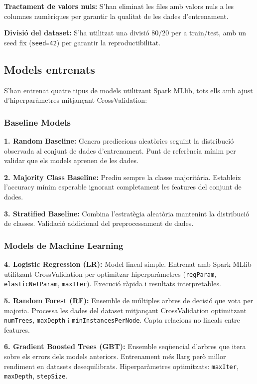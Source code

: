 \documentclass[12pt, a4paper]{article}
\begin{document}
\textbf{Tractament de valors nuls:} S'han eliminat les files amb valors nuls a les columnes numèriques per garantir la qualitat de les dades d'entrenament.

\textbf{Divisió del dataset:} S'ha utilitzat una divisió 80/20 per a train/test, amb un seed fix (\texttt{seed=42}) per garantir la reproductibilitat.

\subsection{Models entrenats}

S'han entrenat quatre tipus de models utilitzant Spark MLlib, tots ells amb ajust d'hiperparàmetres mitjançant CrossValidation:

\subsubsection{Baseline Models}

\textbf{1. Random Baseline:}
Genera prediccions aleatòries seguint la distribució observada al conjunt de dades d'entrenament. Punt de referència mínim per validar que els models aprenen de les dades.

\textbf{2. Majority Class Baseline:}
Prediu sempre la classe majoritària. Estableix l'accuracy mínim esperable ignorant completament les features del conjunt de dades.

\textbf{3. Stratified Baseline:}
Combina l'estratègia aleatòria mantenint la distribució de classes. Validació addicional del preprocessament de dades.

\subsubsection{Models de Machine Learning}

\textbf{4. Logistic Regression (LR):}
Model lineal simple. Entrenat amb Spark MLlib utilitzant CrossValidation per optimitzar hiperparàmetres (\texttt{regParam}, \texttt{elasticNetParam}, \texttt{maxIter}). Execució ràpida i resultats interpretables.

\textbf{5. Random Forest (RF):}
Ensemble de múltiples arbres de decisió que vota per majoria. Processa les dades del dataset mitjançant CrossValidation optimitzant \texttt{numTrees}, \texttt{maxDepth} i \texttt{minInstancesPerNode}. Capta relacions no lineals entre features.

\textbf{6. Gradient Boosted Trees (GBT):}
Ensemble seqüencial d'arbres que itera sobre els errors dels models anteriors. Entrenament més llarg però millor rendiment en datasets desequilibrats. Hiperparàmetres optimitzats: \texttt{maxIter}, \texttt{maxDepth}, \texttt{stepSize}.
\end{document}

